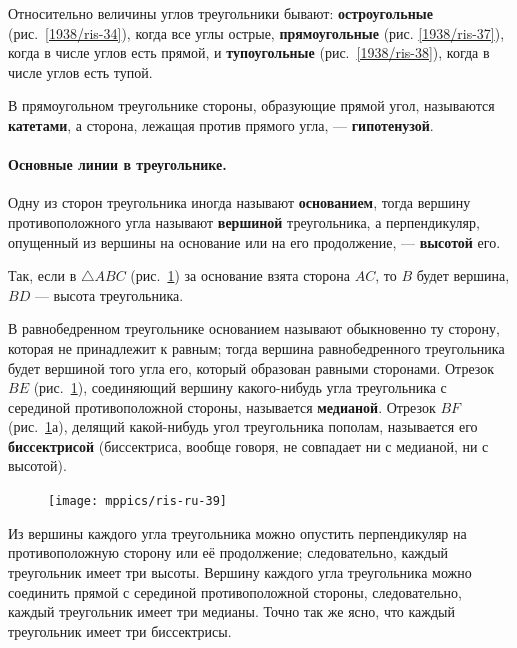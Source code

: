 Относительно величины углов треугольники бывают:
\textbf{остроугольные} (рис.~\ref{1938/ris-34}), когда все углы острые, \textbf{прямоугольные} (рис. \ref{1938/ris-37}), когда в числе углов есть прямой, и \textbf{тупоугольные} (рис.~\ref{1938/ris-38}), когда в числе углов есть тупой.

В прямоугольном треугольнике стороны, образующие прямой угол, называются \textbf{катетами}, а сторона, лежащая против прямого угла, — \textbf{гипотенузой}.

\paragraph{Основные линии в треугольнике.}\label{1938/36}
Одну из сторон треугольника иногда называют \textbf{основанием}, тогда вершину противоположного угла называют \textbf{вершиной} треугольника, а перпендикуляр, опущенный из вершины на основание или на его продолжение, — \textbf{высотой} его.

Так, если в $\triangle ABC$ (рис.~\ref{1938/ris-39}) за основание взята сторона $AC$, то $B$ будет вершина, $BD$ — высота треугольника.

В равнобедренном треугольнике основанием называют обыкновенно ту сторону, которая не принадлежит к равным;
тогда вершина равнобедренного треугольника будет вершиной того угла его, который образован равными сторонами.
Отрезок $BE$ (рис.~\ref{1938/ris-39}), соединяющий вершину какого-нибудь угла треугольника с серединой противоположной стороны, называется \textbf{медианой}.
Отрезок $BF$ (рис.~\ref{1938/ris-39}а), делящий какой-нибудь угол треугольника пополам, называется его \textbf{биссектрисой} (биссектриса, вообще говоря, не совпадает ни с медианой, ни с высотой).

\begin{figure}[h!]
\centering
\texttt{[image: mppics/ris-ru-39]}
\caption{}\label{1938/ris-39}
\end{figure}

Из вершины каждого угла треугольника можно опустить перпендикуляр на противоположную сторону или её продолжение;
следовательно, каждый треугольник имеет три высоты.
Вершину каждого угла треугольника можно соединить прямой с серединой противоположной стороны, следовательно, каждый треугольник имеет три медианы.
Точно так же ясно, что каждый треугольник имеет три биссектрисы.

